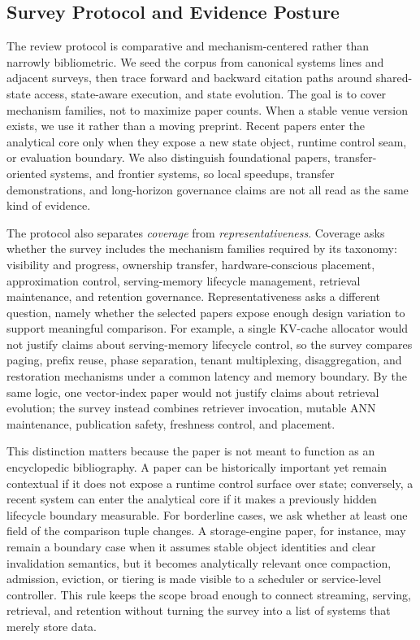 \documentclass[manuscript]{acmart}
\begin{document}
\subsection{Survey Protocol and Evidence Posture}

The review protocol is comparative and mechanism-centered rather than narrowly bibliometric. We seed the corpus from canonical systems lines and adjacent surveys, then trace forward and backward citation paths around shared-state access, state-aware execution, and state evolution. The goal is to cover mechanism families, not to maximize paper counts. When a stable venue version exists, we use it rather than a moving preprint. Recent papers enter the analytical core only when they expose a new state object, runtime control seam, or evaluation boundary. We also distinguish foundational papers, transfer-oriented systems, and frontier systems, so local speedups, transfer demonstrations, and long-horizon governance claims are not all read as the same kind of evidence.

The protocol also separates \emph{coverage} from \emph{representativeness}. Coverage asks whether the survey includes the mechanism families required by its taxonomy: visibility and progress, ownership transfer, hardware-conscious placement, approximation control, serving-memory lifecycle management, retrieval maintenance, and retention governance. Representativeness asks a different question, namely whether the selected papers expose enough design variation to support meaningful comparison. For example, a single KV-cache allocator would not justify claims about serving-memory lifecycle control, so the survey compares paging, prefix reuse, phase separation, tenant multiplexing, disaggregation, and restoration mechanisms under a common latency and memory boundary. By the same logic, one vector-index paper would not justify claims about retrieval evolution; the survey instead combines retriever invocation, mutable ANN maintenance, publication safety, freshness control, and placement.

This distinction matters because the paper is not meant to function as an encyclopedic bibliography. A paper can be historically important yet remain contextual if it does not expose a runtime control surface over state; conversely, a recent system can enter the analytical core if it makes a previously hidden lifecycle boundary measurable. For borderline cases, we ask whether at least one field of the comparison tuple changes. A storage-engine paper, for instance, may remain a boundary case when it assumes stable object identities and clear invalidation semantics, but it becomes analytically relevant once compaction, admission, eviction, or tiering is made visible to a scheduler or service-level controller. This rule keeps the scope broad enough to connect streaming, serving, retrieval, and retention without turning the survey into a list of systems that merely store data.
\end{document}
